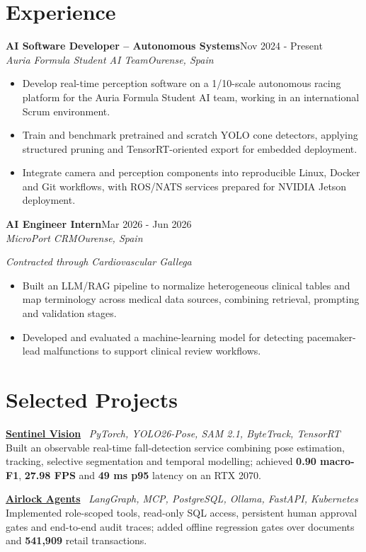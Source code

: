 \documentclass[10pt,a4paper]{article}
\newcommand{\entry}[4]{
  \textbf{#1}\hfill{\small #2}\\[-1pt]
  \textit{#3}\hfill{\small\textit{#4}}\par\vspace{-1.5pt}
}
\newcommand{\project}[3]{
  \textbf{#1} \textbar\ {\small\color{muted}\textit{#2}}\\[-1.5pt]
  #3\par\vspace{1pt}
}
\begin{document}
\section{Experience}
\entry{AI Software Developer -- Autonomous Systems}{Nov 2024 - Present}{Auria Formula Student AI Team}{Ourense, Spain}
\begin{itemize}
  \item Develop real-time perception software on a 1/10-scale autonomous racing platform for the Auria Formula Student AI team, working in an international Scrum environment.
  \item Train and benchmark pretrained and scratch YOLO cone detectors, applying structured pruning and TensorRT-oriented export for embedded deployment.
  \item Integrate camera and perception components into reproducible Linux, Docker and Git workflows, with ROS/NATS services prepared for NVIDIA Jetson deployment.
\end{itemize}

\entry{AI Engineer Intern}{Mar 2026 - Jun 2026}{MicroPort CRM}{Ourense, Spain}
{\small\color{muted}\textit{Contracted through Cardiovascular Gallega}}\par\vspace{-1.5pt}
\begin{itemize}
  \item Built an LLM/RAG pipeline to normalize heterogeneous clinical tables and map terminology across medical data sources, combining retrieval, prompting and validation stages.
  \item Developed and evaluated a machine-learning model for detecting pacemaker-lead malfunctions to support clinical review workflows.
\end{itemize}

\section{Selected Projects}
\project{\href{https://lucasfiz.dev/en/projects/sentinel-vision}{Sentinel Vision}}{PyTorch, YOLO26-Pose, SAM 2.1, ByteTrack, TensorRT}{Built an observable real-time fall-detection service combining pose estimation, tracking, selective segmentation and temporal modelling; achieved \textbf{0.90 macro-F1}, \textbf{27.98 FPS} and \textbf{49 ms p95} latency on an RTX 2070.}

\project{\href{https://lucasfiz.dev/en/projects/airlock-agents}{Airlock Agents}}{LangGraph, MCP, PostgreSQL, Ollama, FastAPI, Kubernetes}{Implemented role-scoped tools, read-only SQL access, persistent human approval gates and end-to-end audit traces; added offline regression gates over documents and \textbf{541,909} retail transactions.}
\end{document}
